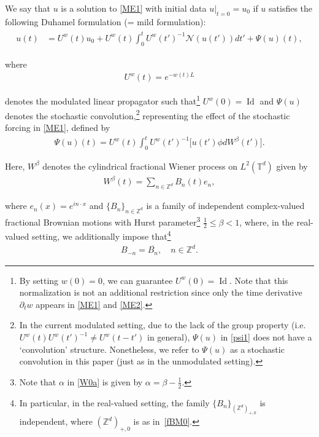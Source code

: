 \documentclass[letterpaper, 11pt,  reqno]{amsart}
\DeclareMathOperator{\Id}{Id}
\newcommand{\1}{\hspace{0.5mm}\textup{I}\hspace{0.5mm}}
\newcommand{\noi}{\noindent}
\newcommand{\Z}{\mathbb{Z}}
\newcommand{\T}{\mathbb{T}}
\newcommand{\al}{\alpha}
\newcommand{\be}{\beta}
\newcommand{\cj}{\overline}
\newcommand{\dt}{\partial_t}
\newcommand{\NN}{\mathcal{N}}
\newcommand{\uw}{U^w}
\numberwithin{equation}{section}
\numberwithin{theorem}{section}
\begin{document}
We say that $u$ is a solution to \eqref{ME1}
with initial data $u|_{t = 0} = u_0$
if $u$ satisfies the following
 Duhamel formulation (= mild formulation):
\begin{align}
\begin{split}
u(t) 
& = U^w(t) u_0 +  U^w({t}) \int_0^t U^w({t'})^{-1}\NN( u(t') ) dt' + \Psi(u) (t), 
\end{split}
\label{mild1}
\end{align}


\noi
where 
\begin{align}
U^w(t) = e^{- w(t) L }
\label{lin1}
\end{align}

\noi
 denotes the modulated linear propagator
such that\footnote{By setting $w(0) = 0$, we can guarantee
  $U^w(0) = \Id$.
 Note that 
 this normalization 
 is not an additional restriction since only the time derivative $\dt w$
 appears in \eqref{ME1} and \eqref{ME2}.}
  $U^w(0) = \Id$
and $\Psi(u)$ denotes the stochastic convolution,\footnote{In the current modulated setting, 
due to the lack of the group property (i.e.~$\uw(t)\uw(t')^{-1} \ne \uw(t - t')$ in general), $\Psi(u)$
in \eqref{psi1} does not have a `convolution' structure.
Nonetheless, we refer to $\Psi(u)$ as a stochastic convolution 
in this paper (just as in the unmodulated setting).} 
representing the effect of the stochastic forcing in \eqref{ME1}, 
defined by 
\begin{align}
\Psi(u)(t) = 
U^w(t) \int_0^t U^w(t')^{-1}
\big[u (t') \phi dW^\be(t')\big].
\label{psi1}
\end{align}



\noi
Here, 
$W^\be$ denotes the cylindrical fractional Wiener process on $L^2(\T^d)$ given by 
\begin{align}
W^\be(t) 
 = \sum_{n\in \Z^d}  
B_n(t) e_n, 
\label{W1}
\end{align}

 
 \noi
where $e_n(x) = e^{in\cdot x}$
and $\{B_n \}_{n \in \Z^d}$ is a family of independent 
complex-valued 
fractional Brownian motions with Hurst parameter\footnote{Note that $\al$ in \eqref{W0a}
is given by $\al = \be -\frac 12$.} $\frac 12 \le \be < 1$, 
where,  in the real-valued setting, 
we additionally impose that\footnote{In particular, in the real-valued setting, 
the family $\{B_n\}_{(\Z^d)_{+,0}}$ is independent, where 
$(\Z^d)_{+,0}$ is as in~\eqref{fBM0}.
} 
\begin{align}
B_{-n} = \cj{B_n}, \quad n \in \Z^d.
\label{W2}
\end{align}
\end{document}
